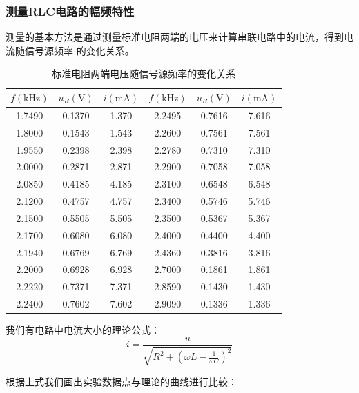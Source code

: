 \documentclass[a4paper]{ctexart}
\def\V{\mathrm{V}}
\begin{document}
    \subsubsection{测量RLC电路的幅频特性}
    \par 
    测量的基本方法是通过测量标准电阻两端的电压来计算串联电路中的电流，得到电流随信号源频率
    的变化关系。
    \begin{table}[htbp]
        \centering
        \caption{标准电阻两端电压随信号源频率的变化关系}
        \begin{tabular}{ccc|ccc}
            \toprule[1.5pt]
            $f(\mathrm{kHz})$ & $u_{R}(\V)$ & $i(\mathrm{mA})$ & $f(\mathrm{kHz})$ & $u_{R}(\V)$ & $i(\mathrm{mA})$\\
            \midrule
            1.7490 & 0.1370 & 1.370 & 2.2495 & 0.7616 & 7.616 \\
            1.8000 & 0.1543 & 1.543 & 2.2600 & 0.7561 & 7.561 \\
            1.9550 & 0.2398 & 2.398 & 2.2780 & 0.7310 & 7.310 \\
            2.0000 & 0.2871 & 2.871 & 2.2900 & 0.7058 & 7.058 \\
            2.0850 & 0.4185 & 4.185 & 2.3100 & 0.6548 & 6.548 \\
            2.1200 & 0.4757 & 4.757 & 2.3400 & 0.5746 & 5.746 \\
            2.1500 & 0.5505 & 5.505 & 2.3500 & 0.5367 & 5.367 \\
            2.1700 & 0.6080 & 6.080 & 2.4000 & 0.4400 & 4.400 \\
            2.1940 & 0.6769 & 6.769 & 2.4360 & 0.3816 & 3.816 \\
            2.2000 & 0.6928 & 6.928 & 2.7000 & 0.1861 & 1.861 \\
            2.2220 & 0.7371 & 7.371 & 2.8590 & 0.1430 & 1.430 \\
            2.2400 & 0.7602 & 7.602 & 2.9090 & 0.1336 & 1.336 \\
            \bottomrule[1.5pt]
        \end{tabular}
    \end{table}
    \par 
    我们有电路中电流大小的理论公式：
    $$
    i = \frac{u}{\sqrt{R^{2} + \left(\omega L - \frac{1}{\omega C}\right)^{2}}}
    $$
    \par 
    根据上式我们画出实验数据点与理论的曲线进行比较：
\end{document}
